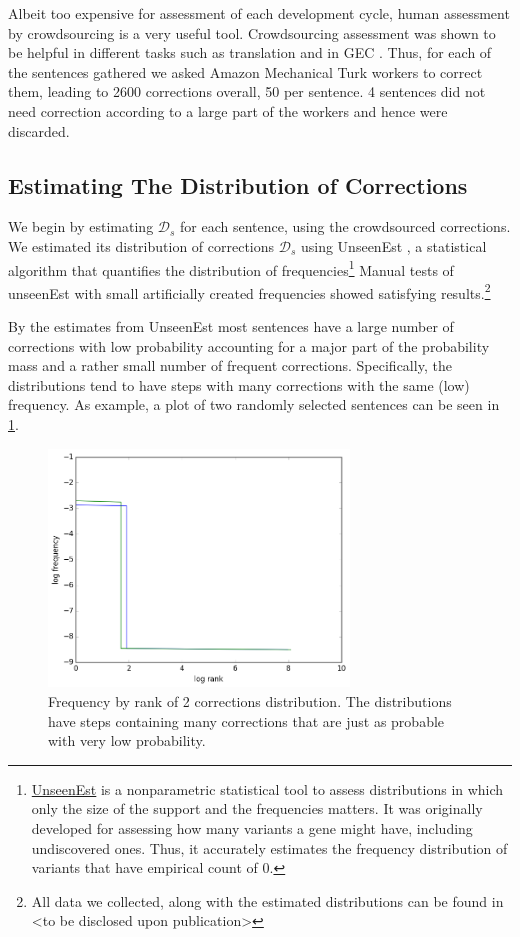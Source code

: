 \documentclass[letter,11pt]{article}
\begin{document}
		Albeit too expensive for assessment of each development cycle, human assessment
		by crowdsourcing is a very useful tool. Crowdsourcing assessment was shown to
		be helpful in different tasks such as translation
		\cite{zaidan2011crowdsourcing,post2012constructing}
		and in GEC \cite{madnani2011they}. %
		Thus, for each of the sentences gathered we asked Amazon Mechanical Turk workers to correct them, leading to 2600 corrections overall,
		50 per sentence. 4 sentences did not need correction according to a large part of the workers and hence were discarded.
		
		\subsection{Estimating The Distribution of Corrections}
		
		We begin by estimating $\mathcal{D}_s$ for each sentence, using the crowdsourced
		corrections. We estimated its distribution of corrections $\mathcal{D}_s$
		using {\sc UnseenEst} \cite{zou2015quantifying}, a statistical algorithm that quantifies
		the distribution of frequencies\footnote{\href{https://github.com/borgr/unseenest}{UnseenEst} is a nonparametric statistical tool to assess distributions in which only the size of the support and the frequencies matters. It was originally developed for assessing how many variants a gene might have, including undiscovered ones. Thus, it accurately estimates the frequency distribution of variants that have empirical count of 0. } Manual tests of unseenEst with small artificially created frequencies showed
		satisfying results.\footnote{All data
			we collected, along with the estimated distributions can be found in <to be disclosed
			upon publication>}
		
		By the estimates from {\sc UnseenEst} most sentences have a large number of corrections with low probability accounting for a major part of the probability mass and a rather small number of frequent corrections. Specifically, the distributions tend to have steps with many corrections with the same (low) frequency. As example, a plot of two randomly selected sentences can be seen in \ref{fig:corrections_dist}.
		
		\begin{figure}
			\includegraphics[width = 8cm]{exact_dists_plot}
			\caption{Frequency by rank of 2 corrections distribution. The distributions have steps containing many corrections that are just as probable with very low probability. 	\label{fig:corrections_dist}}
		\end{figure}
		
\end{document}
